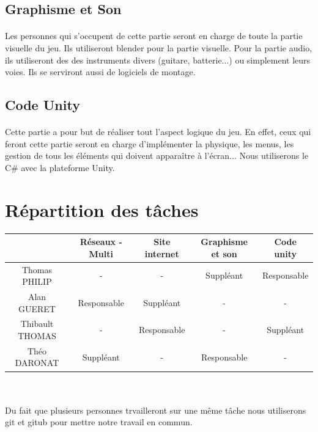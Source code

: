 \documentclass[12pt]{report}
\begin{document}
		\subsection{Graphisme et Son}
		\paragraph{}
		Les personnes qui s'occupent de cette partie seront en charge de toute la partie visuelle du jeu. Ils utiliseront blender pour la partie visuelle. Pour la partie audio, ils utiliseront des
des instruments divers (guitare, batterie...) ou simplement
leurs voies. Ils se serviront aussi de logiciels de montage.\\

		\subsection{Code Unity}
		\paragraph{}
			Cette partie a pour but de réaliser tout l'aspect logique du jeu. En effet, ceux qui feront cette partie seront en charge d'implémenter la physique, les menus, les gestion de tous les éléments qui doivent apparaître à l'écran... Nous
utiliserons le C\# avec la plateforme Unity.\\

	\section{Répartition des tâches}	
	
	\begin{tabular}{|*{5}{c|}}
	\hline
		& Réseaux - Multi & Site internet & Graphisme et son & Code unity \\
		\hline
		Thomas PHILIP & - & - & Suppléant & Responsable \\
		\hline
		Alan GUERET & Responsable & Suppléant & - & - \\
		\hline
		Thibault THOMAS & - & Responsable & - & Suppléant \\
		\hline
		Théo DARONAT & Suppléant & - & Responsable & - \\
		\hline
	
	\end{tabular}
	\\
	\paragraph{}
		Du fait que plusieurs personnes trvailleront sur une même tâche nous utiliserons git et gitub pour mettre notre travail en commun.
\end{document}
